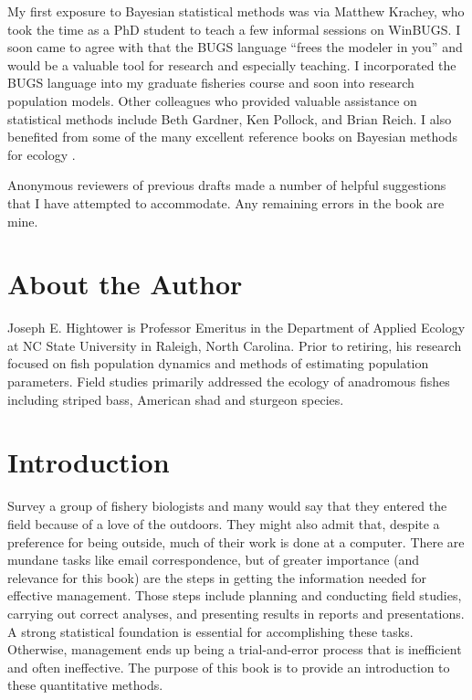 \documentclass[
]{krantz}
\begin{document}
My first exposure to Bayesian statistical methods was via Matthew Krachey, who took the time as a PhD student to teach a few informal sessions on WinBUGS. I soon came to agree with \citet{kéry_2010} that the BUGS language ``frees the modeler in you'' and would be a valuable tool for research and especially teaching. I incorporated the BUGS language into my graduate fisheries course and soon into research population models. Other colleagues who provided valuable assistance on statistical methods include Beth Gardner, Ken Pollock, and Brian Reich. I also benefited from some of the many excellent reference books on Bayesian methods for ecology \citep[e.g.,][]{mccarthy2007, kéry_2010, kéry.schaub_2011}.

Anonymous reviewers of previous drafts made a number of helpful suggestions that I have attempted to accommodate. Any remaining errors in the book are mine.

\hypertarget{about-the-author}{%
\chapter*{About the Author}\label{about-the-author}}


Joseph E. Hightower is Professor Emeritus in the Department of Applied Ecology at NC State University in Raleigh, North Carolina. Prior to retiring, his research focused on fish population dynamics and methods of estimating population parameters. Field studies primarily addressed the ecology of anadromous fishes including striped bass, American shad and sturgeon species.

\mainmatter

\hypertarget{introduction}{%
\chapter{Introduction}\label{introduction}}

Survey a group of fishery biologists and many would say that they entered the field because of a love of the outdoors. They might also admit that, despite a preference for being outside, much of their work is done at a computer. There are mundane tasks like email correspondence, but of greater importance (and relevance for this book) are the steps in getting the information needed for effective management. Those steps include planning and conducting field studies, carrying out correct analyses, and presenting results in reports and presentations. A strong statistical foundation is essential for accomplishing these tasks. Otherwise, management ends up being a trial-and-error process that is inefficient and often ineffective. The purpose of this book is to provide an introduction to these quantitative methods.
\end{document}
